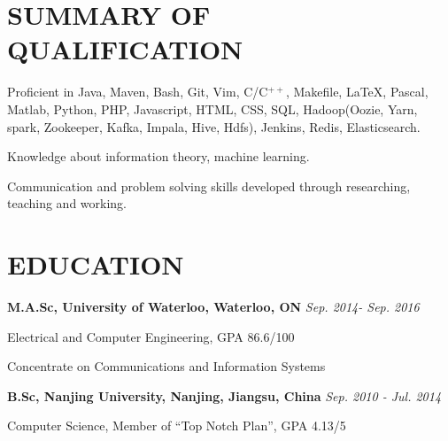 \documentclass{res}
\newcommand{\parsp}{\vspace{-0.7\baselineskip}}
\newcommand{\additemindent}{\addtolength{\itemindent}{1em}}
\begin{document}
\begin{resume}

\parsp
\section{SUMMARY OF QUALIFICATION}
	\begin{asparaitem}
		\item 	Proficient in Java, Maven, Bash, Git, Vim, C/C$^{++}$, Makefile, \LaTeX, Pascal, Matlab, Python, PHP, Javascript, HTML, CSS, SQL, Hadoop(Oozie, Yarn, spark, Zookeeper, Kafka, Impala, Hive, Hdfs), Jenkins, Redis, Elasticsearch.
		\item 	Knowledge about information theory, machine learning.
		\item 	Communication and problem solving skills developed through researching, teaching and working.
	\end{asparaitem}


\parsp
\section{EDUCATION}
	\textbf{M.A.Sc, University of Waterloo, Waterloo, ON} \hfill \emph{Sep. 2014- Sep. 2016
	}
	\begin{asparaitem}[$\circ$]
		\additemindent
		\item Electrical and Computer Engineering, GPA 86.6/100
		\item Concentrate on Communications and Information Systems
  	\end{asparaitem}

  	\vspace{-0.7\baselineskip}

	\textbf{B.Sc, Nanjing University, Nanjing, Jiangsu, China} \hfill \emph{Sep. 2010 - Jul. 2014}
	\begin{asparaitem}[$\circ$]
		\additemindent 
		\item Computer Science, Member of ``Top Notch Plan'', GPA 4.13/5
	\end{asparaitem}




\end{resume}
\end{document}
